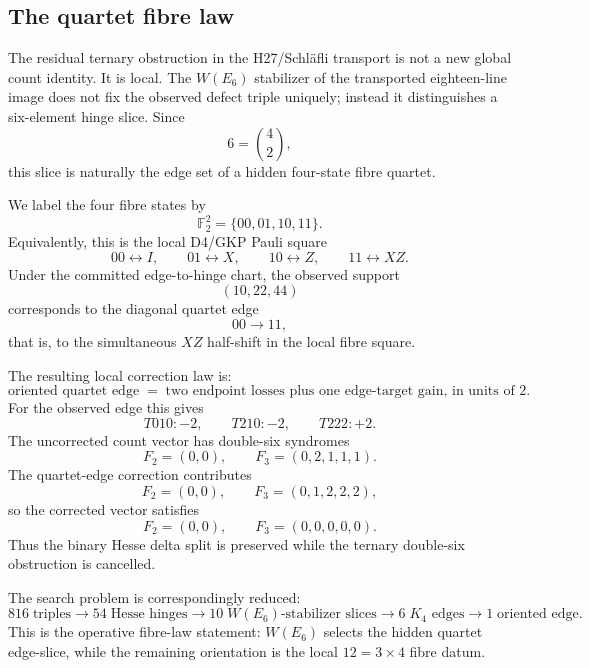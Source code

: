 \subsection{The quartet fibre law}
\label{subsec:quartet-fibre-law}

The residual ternary obstruction in the H27/Schl\"afli transport is not a new global count identity.  It is local.  The $W(E_6)$ stabilizer of the transported eighteen-line image does not fix the observed defect triple uniquely; instead it distinguishes a six-element hinge slice.  Since
\[
  6=\binom{4}{2},
\]
this slice is naturally the edge set of a hidden four-state fibre quartet.

We label the four fibre states by
\[
  \mathbb F_2^2=\{00,01,10,11\}.
\]
Equivalently, this is the local D4/GKP Pauli square
\[
  00\leftrightarrow I,\qquad
  01\leftrightarrow X,\qquad
  10\leftrightarrow Z,\qquad
  11\leftrightarrow XZ.
\]
Under the committed edge-to-hinge chart, the observed support
\[
  (10,22,44)
\]
corresponds to the diagonal quartet edge
\[
  00\longrightarrow 11,
\]
that is, to the simultaneous $XZ$ half-shift in the local fibre square.

The resulting local correction law is:
\[
  \boxed{\text{oriented quartet edge}\;=\;\text{two endpoint losses plus one edge-target gain, in units of }2.}
\]
For the observed edge this gives
\[
  \boxed{T010:-2,\qquad T210:-2,\qquad T222:+2.}
\]
The uncorrected count vector has double-six syndromes
\[
  F_2=(0,0),\qquad F_3=(0,2,1,1,1).
\]
The quartet-edge correction contributes
\[
  F_2=(0,0),\qquad F_3=(0,1,2,2,2),
\]
so the corrected vector satisfies
\[
  \boxed{F_2=(0,0),\qquad F_3=(0,0,0,0,0).}
\]
Thus the binary Hesse delta split is preserved while the ternary double-six obstruction is cancelled.

The search problem is correspondingly reduced:
\[
  816\;\text{triples}
  \longrightarrow 54\;\text{Hesse hinges}
  \longrightarrow 10\;W(E_6)\text{-stabilizer slices}
  \longrightarrow 6\;K_4\text{ edges}
  \longrightarrow 1\;\text{oriented edge}.
\]
This is the operative fibre-law statement: $W(E_6)$ selects the hidden quartet edge-slice, while the remaining orientation is the local $12=3\times4$ fibre datum.
